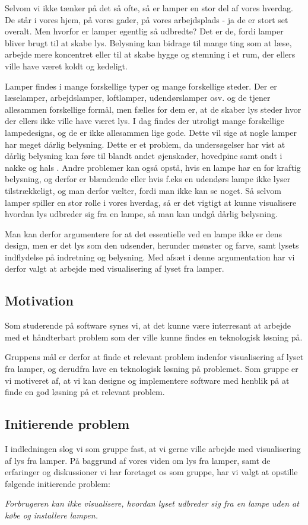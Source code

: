 Selvom vi ikke tænker på det så ofte, så er lamper en stor del af vores hverdag. De står i vores hjem, på vores gader, på vores arbejdsplads - ja de er stort set overalt. Men hvorfor er lamper egentlig så udbredte? Det er de, fordi lamper bliver brugt til at skabe lys. Belysning kan bidrage til mange ting som at læse, arbejde mere koncentret eller til at skabe hygge og stemning i et rum, der ellers ville have været koldt og kedeligt. 

Lamper findes i mange forskellige typer og mange forskellige steder. Der er læselamper, arbejdslamper, loftlamper, udendørslamper osv. og de tjener allesammen forskellige formål, men fælles for dem er, at de skaber lys steder hvor der ellers ikke ville have været lys. 
I dag findes der utroligt mange forskellige lampedesigns, og de er ikke allesammen lige gode. Dette vil sige at nogle lamper har meget dårlig belysning. Dette er et problem, da undersøgelser har vist at dårlig belysning kan føre til blandt andet øjenskader, hovedpine samt ondt i nakke og hals \cite{lys_konsekvenser}. Andre problemer kan også opstå, hvis en lampe har en for kraftig belysning, og derfor er blændende eller hvis f.eks en udendørs lampe ikke lyser tilstrækkeligt, og man derfor vælter, fordi man ikke kan se noget. 
Så selvom lamper spiller en stor rolle i vores hverdag, så er det vigtigt at kunne visualisere hvordan lys udbreder sig fra en lampe, så man kan undgå dårlig belysning. 

Man kan derfor argumentere for at det essentielle ved en lampe ikke er dens design, men er det lys som den udsender, herunder mønster og farve, samt lysets indflydelse på indretning og belysning. Med afsæt i denne argumentation har vi derfor valgt at arbejde med visualisering af lyset fra lamper.

\subsection{Motivation}

Som studerende på software synes vi, at det kunne være interresant at arbejde med et håndterbart problem som der ville kunne findes en teknologisk løsning på. 

Gruppens mål er derfor at finde et relevant problem indenfor visualisering af lyset fra lamper, og derudfra lave en teknologisk løsning på problemet. Som gruppe er vi motiveret af, at vi kan designe og implementere software med henblik på at finde en god løsning på et relevant problem. 

\subsection{Initierende problem}

I indledningen slog vi som gruppe fast, at vi gerne ville arbejde med visualisering af lys fra lamper. På baggrund af vores viden om lys fra lamper, samt de erfaringer og diskussioner vi har foretaget os som gruppe, har vi valgt at opstille følgende initierende problem:

\textit{Forbrugeren kan ikke visualisere, hvordan lyset udbreder sig fra en lampe uden at købe og installere lampen.}